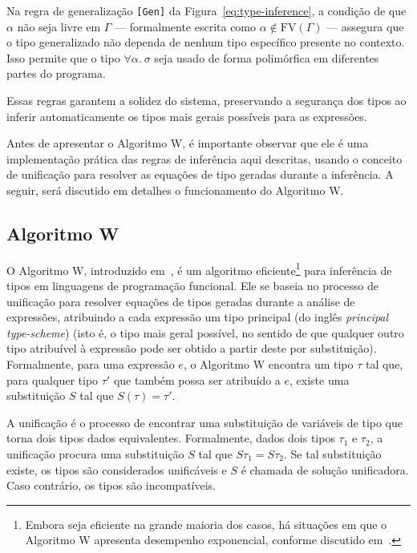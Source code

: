 Na regra de generalização \texttt{[Gen]} da Figura~\ref{eq:type-inference}, a condição de que $\alpha$ não seja livre em $\Gamma$ {---} formalmente escrita como $\alpha \notin \text{FV}(\Gamma)$ {---} assegura que o tipo generalizado não dependa de nenhum tipo específico presente no contexto.
Isso permite que o tipo $\forall \alpha.\ \sigma$ seja usado de forma polimórfica em diferentes partes do programa.

Essas regras garantem a solidez do sistema, preservando a segurança dos tipos ao inferir automaticamente os tipos mais gerais possíveis para as expressões.

Antes de apresentar o Algoritmo W, é importante observar que ele é uma implementação prática das regras de inferência aqui descritas, usando o conceito de unificação para resolver as equações de tipo geradas durante a inferência.
A seguir, será discutido em detalhes o funcionamento do Algoritmo W.

\subsection{Algoritmo W}\label{subsec:w-algo}

O Algoritmo W, introduzido em~, é um algoritmo eficiente\footnote{Embora seja eficiente na grande maioria dos casos, há situações em que o Algoritmo W apresenta desempenho exponencial, conforme discutido em~\cite{vasconcellos2004inferencia}.} para inferência de tipos em linguagens de programação funcional.
Ele se baseia no processo de unificação para resolver equações de tipos geradas durante a análise de expressões, atribuindo a cada expressão um tipo principal (do inglês \textit{principal type-scheme}) (isto é, o tipo mais geral possível, no sentido de que qualquer outro tipo atribuível à expressão pode ser obtido a partir deste por substituição).
Formalmente, para uma expressão $e$, o Algoritmo W encontra um tipo $\tau$ tal que, para qualquer tipo $\tau'$ que também possa ser atribuído a $e$, existe uma substituição $S$ tal que $S(\tau) = \tau'$.

A unificação é o processo de encontrar uma substituição de variáveis de tipo que torna dois tipos dados equivalentes.
Formalmente, dados dois tipos $\tau_1$ e $\tau_2$, a unificação procura uma substituição $S$ tal que $S\tau_1 = S\tau_2$.
Se tal substituição existe, os tipos são considerados unificáveis e $S$ é chamada de solução unificadora.
Caso contrário, os tipos são incompatíveis.

